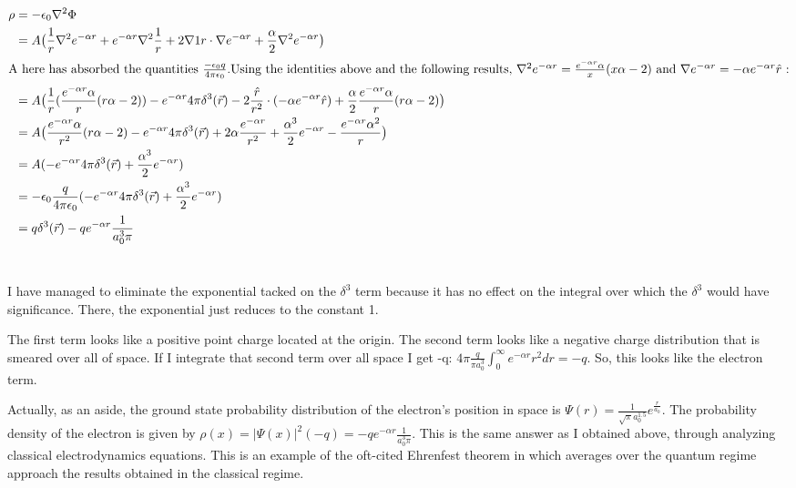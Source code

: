 \begin{homeworkProblem}
\begin{align}
	\rho &= -\epsilon_0 \nabla^2 \Phi \nonumber \\
	&= A \big(\frac{1}{r}\nabla^2 e^{-\alpha r} + e^{-\alpha r}\nabla^2 \frac{1}{r} + 2 \nabla {1}{r} \cdot \nabla e^{-\alpha r} + \frac{\alpha}{2}\nabla^2 e^{-\alpha r}\big) \nonumber \\
	\intertext{A here has absorbed the quantities $\frac{-\epsilon_0 q}{4\pi \epsilon_0}$.Using the identities above and the following results, $\nabla^2 e^{- \alpha r} = \frac{e^{-\alpha r}\alpha}{x}(x\alpha -2)$ and $\nabla e^{-\alpha r} = - \alpha e^{-\alpha r} \hat{r}$ :}
		&= A \big(\frac{1}{r}(\frac{e^{-\alpha r}\alpha}{r}(r\alpha -2)) - e^{-\alpha r}4\pi \delta^3(\vec{r})-2	\frac{\hat{r}}{r^2} \cdot (-\alpha e^{-\alpha r} \hat{r}) + \frac{\alpha}{2}\frac{e^{-\alpha r}\alpha}{r}(r\alpha -2)\big) \nonumber \\
	&= A \big( \frac{e^{-\alpha r}\alpha}{r^2}(r\alpha -2) - e^{-\alpha r}4\pi \delta^3(\vec{r}) + 2 \alpha \frac{e^{-\alpha r}}{r^2} + \frac{\alpha^3}{2} e^{-\alpha r} -\frac{e^{-\alpha r} \alpha^2}{r} \big) \nonumber \\
	&= A (-e^{-\alpha r} 4\pi \delta^3(\vec{r}) + \frac{\alpha^3}{2}e^{-\alpha r}) \nonumber \\
	&= -\epsilon_0 \frac{q}{4\pi \epsilon_0} (-e^{-\alpha r} 4\pi \delta^3(\vec{r}) + \frac{\alpha^3}{2}e^{-\alpha r}) \nonumber \\
	&= q \delta^3(\vec{r}) - q e^{-\alpha r} \frac{1}{a_0^3 \pi} \nonumber
\end{align}
\\ \par
I have managed to eliminate the exponential tacked on the $\delta^3$ term because it has no effect on the integral over which the $\delta^3$ would have significance. There, the exponential just reduces to the constant 1.
\\ \par
The first term looks like a positive point charge located at the origin. The second term looks like a negative charge distribution that is smeared over all of space. If I integrate that second term over all space I get -q: $4\pi \frac{q}{\pi a_0^3} \int_0^{\infty} e^{-\alpha r} r^2 dr = -q$. So, this looks like the electron term.
\\ 
\par
Actually, as an aside, the ground state probability distribution of the electron's position in space is $\Psi(r) = \frac{1}{\sqrt{\pi} a_0^{1.5}}e^{\frac{r}{a_0}}$. The probability density of the electron is given by $\rho(x) = |\Psi(x)|^2 (-q) = -q e^{-\alpha r} \frac{1}{a_0^3 \pi}$. This is the same answer as I obtained above, through analyzing classical electrodynamics equations. This is an example of the oft-cited Ehrenfest theorem in which averages over the quantum regime approach the results obtained in the classical regime.

\end{homeworkProblem}